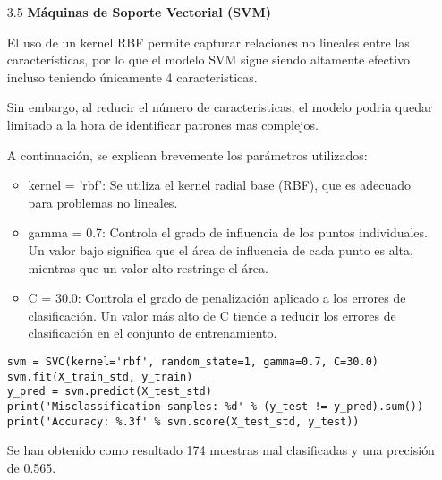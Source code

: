 \documentclass{article}
\begin{document}
\begin{itemize}

\item[3.5]  {\bf M\'aquinas de Soporte Vectorial (SVM)}

El uso de un kernel RBF permite capturar relaciones no lineales entre las caracter\'isticas, por lo que el modelo SVM sigue siendo altamente efectivo incluso teniendo \'unicamente 4 caracteristicas.

Sin embargo, al reducir el n\'umero de caracteristicas, el modelo podria quedar limitado a la hora de identificar patrones mas complejos.

A continuaci\'on, se explican brevemente los par\'ametros utilizados:

\begin{itemize}

\item
kernel = 'rbf': Se utiliza el kernel radial base (RBF), que es adecuado para problemas no lineales.

\item
gamma = 0.7: Controla el grado de influencia de los puntos individuales. Un valor bajo significa que el \'area de influencia de cada punto es alta, mientras que un valor alto restringe el \'area.

\item
C = 30.0: Controla el grado de penalizaci\'on aplicado a los errores de clasificaci\'on. Un valor m\'as alto de C tiende a reducir los errores de clasificaci\'on en el conjunto de entrenamiento.

\end{itemize}

\begin{tcolorbox}[width=14cm]
\begin{scriptsize}
\begin{verbatim}
svm = SVC(kernel='rbf', random_state=1, gamma=0.7, C=30.0)
svm.fit(X_train_std, y_train)
y_pred = svm.predict(X_test_std)
print('Misclassification samples: %d' % (y_test != y_pred).sum())
print('Accuracy: %.3f' % svm.score(X_test_std, y_test))
\end{verbatim}
\end{scriptsize}
\end{tcolorbox}

Se han obtenido como resultado 174 muestras mal clasificadas y una precisi\'on de 0.565.

\end{itemize}

\newpage
\end{document}
